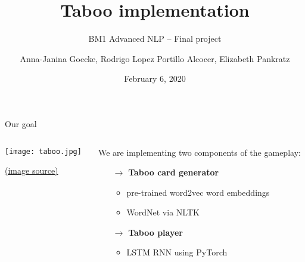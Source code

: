 \documentclass[11pt]{beamer}
\title{Taboo implementation}
\subtitle{BM1 Advanced NLP -- Final project}
\date{February 6, 2020}
\author{Anna-Janina Goecke, \newline Rodrigo Lopez Portillo Alcocer, \newline Elizabeth Pankratz \newline}
\institute{Universität Potsdam}
\begin{document}
	
\maketitle


\begin{frame}{Our goal}

\begin{columns}

\begin{column}{0.5\textwidth}

	\begin{center}
		\texttt{[image: taboo.jpg]}
	\end{center}
		
	\vfill 
	{\tiny \href{https://www.amazon.com/Hasbro-A4626-Taboo-Board-Game/dp/B00D4NJSBW}{(image source)} }

\end{column}

\begin{column}{0.5\textwidth}

	We are implementing two components of the gameplay:
	
	\begin{itemize}
		\item[$\rightarrow$] \textbf{Taboo card generator}
		\begin{itemize}
			\item pre-trained word2vec word embeddings
			\item WordNet via NLTK
		\end{itemize}
		\item[$\rightarrow$] \textbf{Taboo player}
		\begin{itemize}
			\item LSTM RNN using PyTorch
		\end{itemize}
	\end{itemize}

\end{column}
	
\end{columns}

\end{frame}

\end{document}
